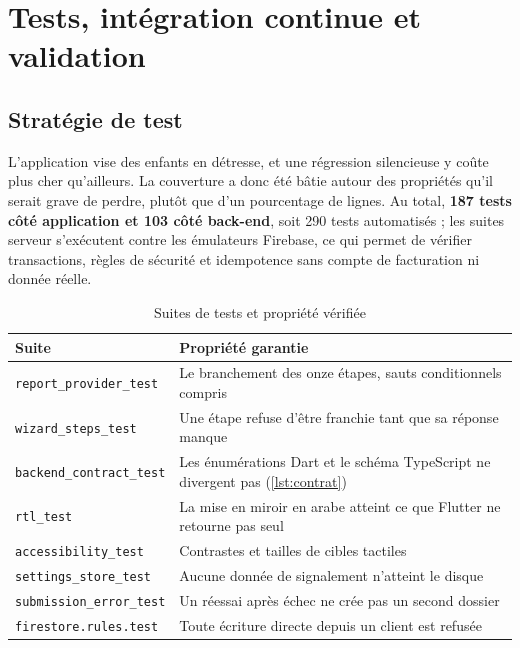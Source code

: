 \documentclass[11pt,a4paper,oneside,openany]{report}
\begin{document}
\chapter{Tests, intégration continue et validation}
\label{chap:tests}

\section{Stratégie de test}

L'application vise des enfants en détresse, et une régression silencieuse y coûte
plus cher qu'ailleurs. La couverture a donc été bâtie autour des propriétés qu'il
serait grave de perdre, plutôt que d'un pourcentage de lignes. Au total,
\textbf{187 tests côté application et 103 côté back-end}, soit 290 tests
automatisés ; les suites serveur s'exécutent contre les émulateurs Firebase, ce
qui permet de vérifier transactions, règles de sécurité et idempotence sans
compte de facturation ni donnée réelle.

\begin{table}[htbp]
\centering
\small
\caption{Suites de tests et propriété vérifiée}
\label{tab:tests}
\begin{tabularx}{\textwidth}{@{}L{4.6cm} X@{}}
\toprule
\textbf{Suite} & \textbf{Propriété garantie} \\
\midrule
\texttt{report\_provider\_test} & Le branchement des onze étapes, sauts conditionnels compris \\
\texttt{wizard\_steps\_test} & Une étape refuse d'être franchie tant que sa réponse manque \\
\texttt{backend\_contract\_test} & Les énumérations Dart et le schéma TypeScript
ne divergent pas (\cref{lst:contrat}) \\
\texttt{rtl\_test} & La mise en miroir en arabe atteint ce que Flutter ne retourne pas seul \\
\texttt{accessibility\_test} & Contrastes et tailles de cibles tactiles \\
\texttt{settings\_store\_test} & Aucune donnée de signalement n'atteint le disque \\
\texttt{submission\_error\_test} & Un réessai après échec ne crée pas un second
dossier \\
\texttt{firestore.rules.test} & Toute écriture directe depuis un client est
refusée \\
\bottomrule
\end{tabularx}
\end{table}
\end{document}
